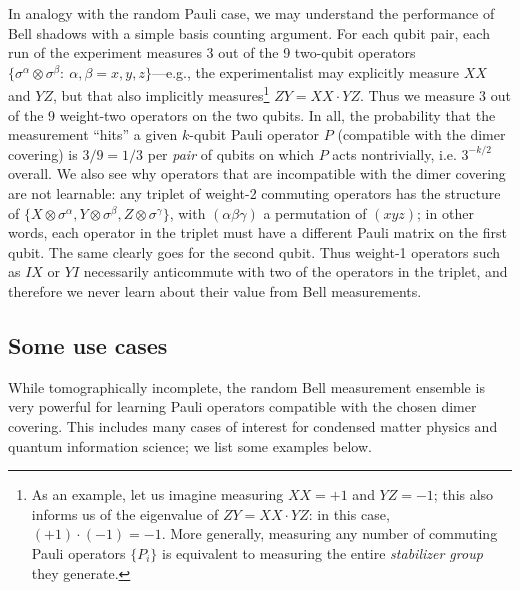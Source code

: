 \documentclass[a4paper,twocolumns,11pt,accepted=2024-03-04]{quantumarticle}
\begin{document}
In analogy with the random Pauli case, we may understand the performance of Bell shadows with a simple basis counting argument. For each qubit pair, each run of the experiment measures 3 out of the 9 two-qubit operators $\{\sigma^\alpha\otimes \sigma^\beta:\ \alpha,\beta = x, y, z\}$---e.g., the experimentalist may explicitly measure $XX$ and $YZ$, but that also implicitly measures\footnote{As an example, let us imagine measuring $XX = +1$ and $YZ = -1$; this also informs us of the eigenvalue of $ZY = XX \cdot YZ$: in this case, $(+1)\cdot(-1) = -1$. More generally, measuring any number of commuting Pauli operators $\{P_i\}$ is equivalent to measuring the entire {\it stabilizer group} they generate.} $ZY = XX\cdot YZ$. Thus we measure 3 out of the 9 weight-two operators on the two qubits. In all, the probability that the measurement ``hits'' a given $k$-qubit Pauli operator $P$ (compatible with the dimer covering) is $3/9 = 1/3$ per {\it pair} of qubits on which $P$ acts nontrivially, i.e. $3^{-k/2}$ overall. We also see why operators that are incompatible with the dimer covering are not learnable:
any triplet of weight-2 commuting operators has the structure of $\{X\otimes \sigma^\alpha, Y\otimes \sigma^\beta, Z\otimes \sigma^\gamma\}$, with $(\alpha \beta \gamma)$ a permutation of $(xyz)$; in other words, each operator in the triplet must have a different Pauli matrix on the first qubit. The same clearly goes for the second qubit. Thus weight-1 operators such as $IX$ or $YI$ necessarily anticommute with two of the operators in the triplet, and therefore we never learn about their value from Bell measurements.

\subsection{Some use cases}\label{sec:bell_app}

While tomographically incomplete, the random Bell measurement ensemble is very powerful for learning Pauli operators compatible with the chosen dimer covering. 
This includes many cases of interest for condensed matter physics and quantum information science; we list some examples below.
\end{document}
